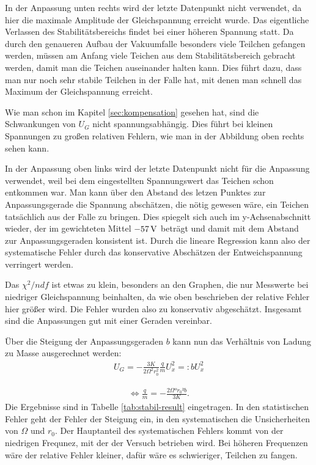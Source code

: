 \documentclass[a4paper,12pt]{article}
\begin{document}
In der Anpassung unten rechts wird der letzte Datenpunkt nicht verwendet, da hier die maximale Amplitude der Gleichspannung erreicht wurde.
Das eigentliche Verlassen des Stabilitätsbereichs findet bei einer höheren Spannung statt.
Da durch den genaueren Aufbau der Vakuumfalle besonders viele Teilchen gefangen werden, müssen am Anfang viele Teichen aus dem Stabilitätsbereich gebracht werden, 
damit man die Teichen auseinander halten kann.
Dies führt dazu, dass man nur noch sehr stabile Teilchen in der Falle hat, mit denen man schnell das Maximum der Gleichspannung erreicht.

Wie man schon im Kapitel \ref{sec:kompensation} gesehen hat, sind die Schwankungen von $U_G$ nicht spannungsabhängig.
Dies führt bei kleinen Spannungen zu großen relativen Fehlern, wie man in der Abbildung oben rechts sehen kann.


In der Anpassung oben links wird der letzte Datenpunkt nicht für die Anpassung verwendet, weil bei dem eingestellten Spannungswert das Teichen schon entkommen war.
Man kann über den Abstand des letzen Punktes zur Anpassungsgerade die Spannung abschätzen, die nötig gewesen wäre, ein Teichen tatsächlich aus der Falle zu bringen.
Dies spiegelt sich auch im y-Achsenabschnitt wieder, der im gewichteten Mittel $-\unit[57]{V}$ beträgt und damit mit dem Abstand zur Anpassungsgeraden konsistent ist.
Durch die lineare Regression kann also der systematische Fehler durch das konservative Abschätzen der Entweichspannung verringert werden.


Das $χ^2/ndf$ ist etwas zu klein, besonders an den Graphen, die nur Messwerte bei niedriger Gleichspannung beinhalten, da wie oben beschrieben der relative Fehler hier größer wird.
Die Fehler wurden also zu konservativ abgeschätzt.
Insgesamt sind die Anpassungen gut mit einer Geraden vereinbar.


Über die Steigung der Anpassungsgeraden $b$ kann nun das Verhältnis von Ladung zu Masse ausgerechnet werden:
\begin{align*}
	U_G = -\frac{3K}{2Ω^2r_0^2}\frac{q}{m} U_x^2 =: b U_x^2
\end{align*}

\begin{align*}
	\Leftrightarrow \frac{q}{m} = -\frac{2Ωºr_0² b}{3K}.
\end{align*}
Die Ergebnisse sind in Tabelle \ref{tab:stabil-result} eingetragen.
In den statistischen Fehler geht der Fehler der Steigung ein, in den systematischen die Unsicherheiten von $Ω$ und $r_0$.
Der Hauptanteil des systematischen Fehlers kommt von der niedrigen Frequnez, mit der der Versuch betrieben wird.
Bei höheren Frequenzen wäre der relative Fehler kleiner, dafür wäre es schwieriger, Teilchen zu fangen.
\end{document}
